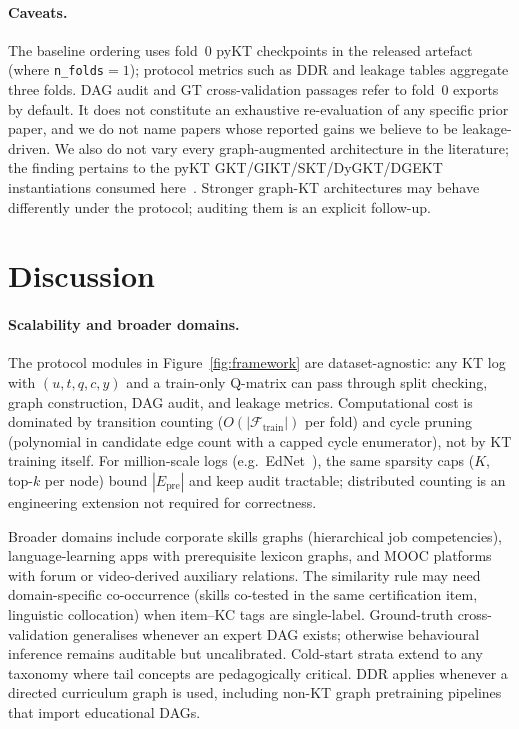 \documentclass[runningheads]{llncs}
\newcommand{\Epre}{\ensuremath{E_{\text{pre}}}}
\newcommand{\DDR}{\textsc{DDR}}
\begin{document}
\paragraph{Caveats.}
The baseline ordering uses fold~0 pyKT checkpoints in the released artefact
(where \texttt{n\_folds}${=}1$); protocol metrics such as \DDR{} and leakage
tables aggregate three folds. DAG audit and GT cross-validation passages refer
to fold~0 exports by default. It does not constitute an exhaustive re-evaluation of any specific
prior paper, and we do not name papers whose reported gains we believe
to be leakage-driven. We also do not vary every graph-augmented architecture
in the literature; the finding pertains to the pyKT GKT/GIKT/SKT/DyGKT/DGEKT
instantiations consumed here~\cite{liu2022pykt}. Stronger graph-KT architectures
\cite{tong2020skt,dygkt2024,dgekt2024} may behave differently under
the protocol; auditing them is an explicit follow-up.
\section{Discussion}
\label{sec:disc}
\paragraph{Scalability and broader domains.}
The protocol modules in Figure~\ref{fig:framework} are dataset-agnostic:
any KT log with $(u,t,q,c,y)$ and a train-only Q-matrix can pass through
split checking, graph construction, DAG audit, and leakage metrics.
Computational cost is dominated by transition counting
($O(|\mathcal{F}_{\text{train}}|)$ per fold) and cycle pruning
(polynomial in candidate edge count with a capped cycle enumerator), not
by KT training itself. For million-scale logs (e.g.\ EdNet~\cite{choi2020ednet}),
the same sparsity caps ($K$, top-$k$ per node) bound $|\Epre|$ and keep
audit tractable; distributed counting is an engineering extension not
required for correctness.

Broader domains include corporate skills graphs (hierarchical job
competencies), language-learning apps with prerequisite lexicon graphs,
and MOOC platforms with forum or video-derived auxiliary relations. The
similarity rule may need domain-specific co-occurrence (skills co-tested
in the same certification item, linguistic collocation) when item--KC
tags are single-label. Ground-truth cross-validation generalises whenever
an expert DAG exists; otherwise behavioural inference remains auditable
but uncalibrated. Cold-start strata extend to any taxonomy where tail
concepts are pedagogically critical. \DDR{} applies whenever a directed
curriculum graph is used, including non-KT graph pretraining pipelines
that import educational DAGs.
\end{document}

